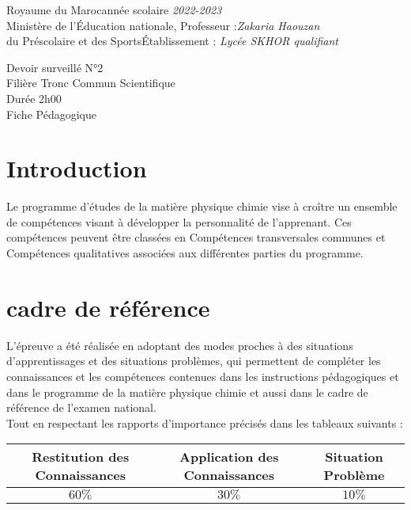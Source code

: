 \documentclass[12pt]{article}
\newcommand\headerMe[2]{\noindent{}#1\hfill#2}
\begin{document}
\headerMe{Royaume du Maroc}{année scolaire \emph{2022-2023}}\\
\headerMe{Ministère de l'Éducation nationale, }{  Professeur :\emph{Zakaria Haouzan}}\\
\headerMe{du Préscolaire et des Sports}{Établissement : \emph{Lycée SKHOR qualifiant}}\\

\begin{center}
Devoir surveillé N°2 \\
 Filière Tronc Commun Scientifique \\
Durée 2h00
\\
    \vspace{.2cm}
\hrulefill
\Large{Fiche Pédagogique}
\hrulefill\\
\end{center}


\section[A]{Introduction }
\hspace{0.5cm}Le programme d'études de la matière physique chimie vise à croître un ensemble de compétences visant à développer la personnalité de l'apprenant. Ces compétences peuvent être classées en Compétences transversales communes et Compétences qualitatives associées aux différentes parties du programme.
\section{cadre de référence }
 \hspace{0.5cm}L'épreuve a été réalisée en adoptant des modes proches à des situations d'apprentissages et des situations problèmes, qui permettent de compléter les connaissances et les compétences contenues dans les instructions pédagogiques et dans le programme de la matière physique chimie et aussi dans le cadre de référence de l'examen national. 
 \\Tout en respectant les rapports d'importance précisés dans les tableaux suivants :
 \begin{center}
\begin{tabular}{|c||c||c|}
\hline
    \textbf{Restitution des Connaissances} & \textbf{Application des Connaissances} & \textbf{Situation Problème }\\
    \hline
    $60\%$ & $30\%$ & $10\%$\\
    \hline
\end{tabular} 
\end{center}
\end{document}
